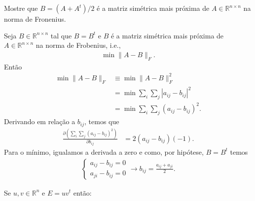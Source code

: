\documentclass[a4paper,12pt, leqno, answers]{exam}
\begin{document}
\begin{questions}
    \question Mostre que $B = \left( A + A^t \right) / 2$ \'{e} a matriz sim\'{e}trica mais pr\'{o}xima de $A \in \mathbb{R}^{n \times n}$ na norma de Fronenius.
    \begin{solution}
        Seja $B \in \mathbb{R}^{n \times n}$ tal que $B = B^t$ e $B$ \'{e} a matriz sim\'{e}trica mais pr\'{o}xima de $A \in \mathbb{R}^{n \times n}$ na norma de Frobenius, i.e.,
        \begin{align*}
            \min \| A - B \|_F.
        \end{align*}
        Ent\~{a}o
        \begin{align*}
            \min \| A - B \|_F &\equiv \min \| A - B \|_F^2 \\
            &= \min \sum_i \sum_j | a_{ij} - b_{ij} |^2 \\
            &= \min \sum_i \sum_j \left( a_{ij} - b_{ij} \right)^2.
        \end{align*}
        Derivando em rela\c{c}\~{a}o a $b_{ij}$, temos que
        \begin{align*}
            \frac{\partial \left( \sum_i \sum_j \left( a_{ij} - b_{ij} \right)^2 \right)}{\partial b_{ij}} &= 2 \left( a_{ij} - b_{ij} \right) \left( -1 \right).
        \end{align*}
        Para o m\'{i}nimo, igualamos a derivada a zero e como, por hip\'{o}tese, $B = B^t$ temos
        \begin{align*}
            \begin{cases}
                a_{ij} - b_{ij} = 0 \\
                a_{ji} - b_{ij} = 0
            \end{cases} \rightarrow b_{ij} = \frac{a_{ij} + a_{ji}}{2}.
        \end{align*}
    \end{solution}

    \question Se $u, v \in \mathbb{R}^n$ e $E = u v^t$ ent\~{a}o:
\end{questions}
\end{document}
